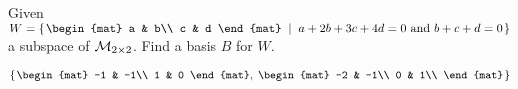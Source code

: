 
\begin{Exercise}[
name={},
title={}, 
difficulty=0,
origin={\cite{YL}}]
Given\\
$W=\set{\begin{mat}
a & b\\
c & d
\end{mat}
\suchthat a+2b+3c+4d=0\text{ and } b+c+d=0}$
a subspace of $\mathcal{M}_{2\times 2}$. Find a basis $B$ for $W$.


\end{Exercise}

\begin{Answer}
$\set{\begin{mat}
-1 & -1\\
1 & 0
\end{mat},\;
\begin{mat}
-2 & -1\\
0 & 1\\
\end{mat}}$
\end{Answer}
